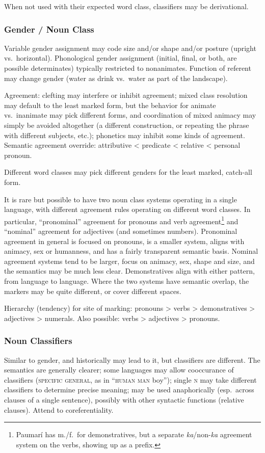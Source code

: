 \documentclass[11pt]{article}
\newcommand{\I}[1]{\textsc{#1}}   %
\begin{document}
When not used with their expected word class, classifiers may be
derivational.

\subsubsection{Gender / Noun Class}
Variable gender assignment may code size and/or shape and/or posture
(upright vs.\ horizontal).  Phonological gender assignment (initial,
final, or both, are possible determinates) typically restricted to
nonanimates.  Function of referent may change gender (water as drink
vs.\ water as part of the landscape).

Agreement: clefting may interfere or inhibit agreement; mixed class
resolution may default to the least marked form, but the behavior for
animate vs.\ inanimate may pick different forms, and coordination of
mixed animacy may simply be avoided altogether (a different
construction, or repeating the phrase with different subjects, etc.);
phonetics may inhibit some kinds of agreement.  Semantic agreement
override: attributive < predicate < relative < personal pronoun.

Different word classes may pick different genders for the least
marked, catch-all form.

It is rare but possible to have two noun class systems operating in a
single language, with different agreement rules operating on different
word classes.  In particular, ``pronominal'' agreement for pronouns
and verb agreement\footnote{Paumarí has m./f.\ for demonstratives, but
a separate \textit{ka}/non-\textit{ka} agreement system on the
verbs, showing up as a prefix.} and ``nominal'' agreement for
adjectives (and sometimes numbers).  Pronominal agreement in general
is focused on pronouns, is a smaller system, aligns with animacy, sex
or humanness, and has a fairly transparent semantic basis.  Nominal
agreement systems tend to be larger, focus on animacy, sex, shape and
size, and the semantics may be much less clear.  Demonstratives align
with either pattern, from language to language.  Where the two systems
have semantic overlap, the markers may be quite different, or cover
different spaces.

Hierarchy (tendency) for site of marking: pronouns > verbs >
demonstratives > adjectives > numerals. Also possible: verbs >
adjectives > pronouns.

\subsubsection{Noun Classifiers}
Similar to gender, and historically may lead to it, but classifiers
are different.  The semantics are generally clearer; some languages
may allow cooccurance of classifiers (\I{specific general}, as in
``\I{human man} boy''); single \I{n} may take different classifiers to
determine precise meaning; may be used anaphorically (esp.\ across
clauses of a single sentence), possibly with other syntactic functions
(relative clauses).  Attend to coreferentiality.
\end{document}
